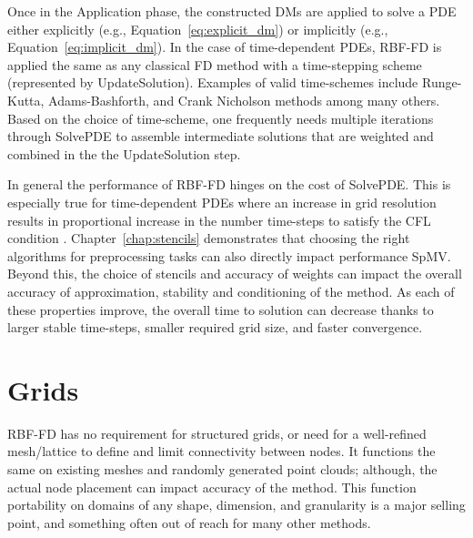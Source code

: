 \documentclass[11pt]{report}
\begin{document}
{Once in the Application phase, the constructed DMs are applied to solve a PDE either explicitly (e.g., Equation~\ref{eq:explicit_dm}) or implicitly (e.g., Equation~\ref{eq:implicit_dm}). In the case of time-dependent PDEs, RBF-FD is applied the same as any classical FD method with a time-stepping scheme (represented by UpdateSolution). Examples of valid time-schemes include Runge-Kutta, Adams-Bashforth, and Crank Nicholson methods among many others. Based on the choice of time-scheme, one frequently needs multiple iterations through SolvePDE to assemble intermediate solutions that are weighted and combined in the the UpdateSolution step.


In general the performance of RBF-FD hinges on the cost of SolvePDE. This is especially true for time-dependent PDEs where an increase in grid resolution results in proportional increase in the number time-steps to satisfy the CFL condition \cite{CFL}. Chapter~\ref{chap:stencils} demonstrates that choosing the right algorithms for preprocessing tasks can also directly impact performance SpMV. Beyond this, the choice of stencils and accuracy of weights can impact the overall accuracy of approximation, stability and conditioning of the method. As each of these properties improve, the overall time to solution can decrease thanks to larger stable time-steps, smaller required grid size, and faster convergence.

\section{Grids} 

RBF-FD has no requirement for structured grids, or need for a well-refined mesh/lattice to define and limit connectivity between nodes. It functions the same on existing meshes and randomly generated point clouds; although, the actual node placement can impact accuracy of the method. This function portability on domains of any shape, dimension, and granularity is a major selling point, and something often out of reach for many other methods. 




}
\end{document}
